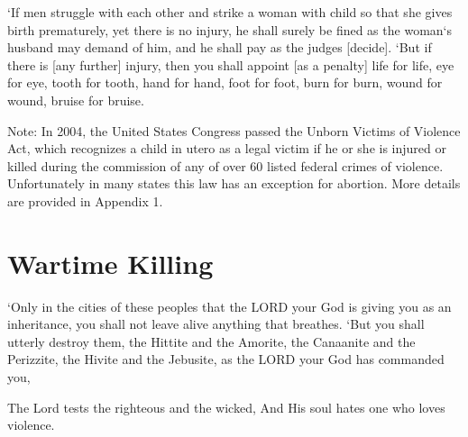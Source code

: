 \begin{scripture}[Exodus 21:22-25]
    `If men struggle with each other and strike a woman with child so that she gives birth prematurely, yet there is no injury, he shall surely be fined as the woman`s husband may demand of him, and he shall pay as the judges [decide].
    `But if there is [any further] injury, then you shall appoint [as a penalty] life for life,
    eye for eye, tooth for tooth, hand for hand, foot for foot,
    burn for burn, wound for wound, bruise for bruise.
\end{scripture}
\vspace{3\baselineskip}

\begin{small}
Note: In 2004, the United States Congress passed the Unborn Victims of Violence Act, which recognizes a child in
utero as a legal victim if he or she is injured or killed during the commission of any of over 60 listed federal crimes of violence. Unfortunately in many
states this law has an exception for abortion. More details are provided in Appendix 1.
\end{small}

\newpage
\section{Wartime Killing}
\begin{scripture}[Deuteronomy 20:16-17]
    `Only in the cities of these peoples that the LORD your God is giving you as an inheritance, you shall not leave alive anything that breathes.
    `But you shall utterly destroy them, the Hittite and the Amorite, the Canaanite and the Perizzite, the Hivite and the Jebusite, as the LORD your God has commanded you,
\end{scripture}


\vspace{4\baselineskip}

\begin{scripture}[Psalm 11:5]
     
    The Lord tests the righteous and the wicked, And His soul hates one who loves violence.
\end{scripture}

